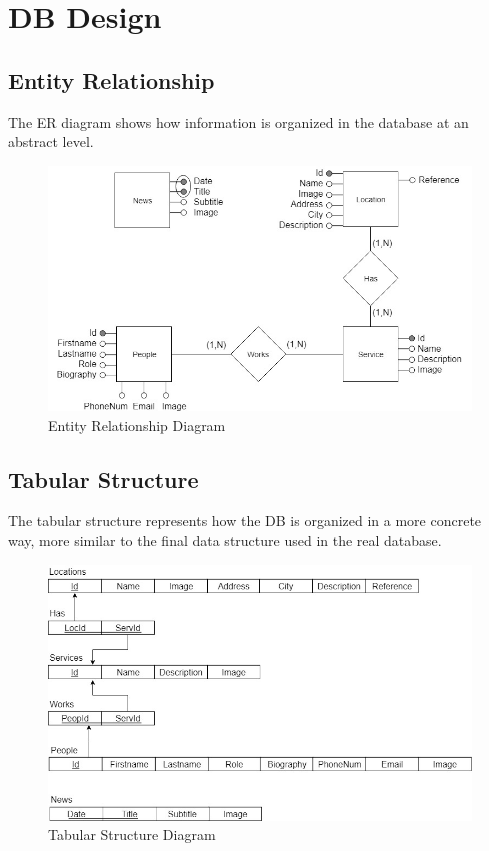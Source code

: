 %
%
\chapter{DB Design}
%
%
\section{Entity Relationship}
\par The ER diagram shows how information is organized in the database at an abstract level.
\begin{figure}[h]
\includegraphics[width=1.2\textwidth, center]{MainMatter/ER.jpg}
\caption{Entity Relationship Diagram}
\label{fig:figure2}
\end{figure}
\newpage
%
\section{Tabular Structure}
\par The tabular structure represents how the DB is organized in a more concrete way, more similar to the final data structure used in the real database.
\begin{figure}[h]
\includegraphics[width=1.2\textwidth, center]{MainMatter/DB.jpg}
\caption{Tabular Structure Diagram}
\label{fig:figure2}
\end{figure}
%
%
